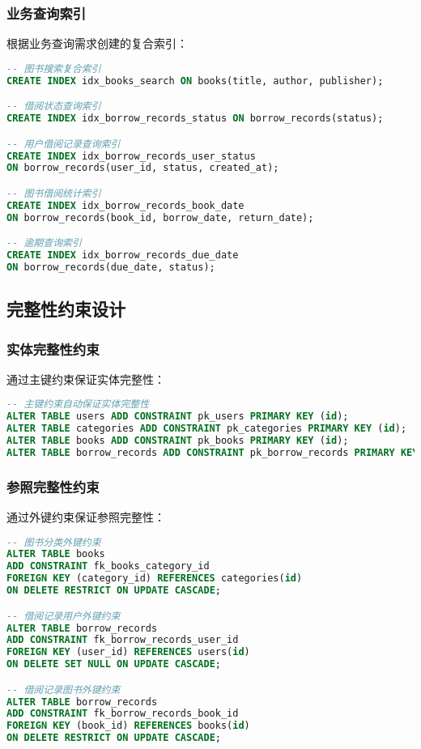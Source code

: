 \documentclass[12pt,a4paper]{article}
\begin{document}
\subsubsection{业务查询索引}
根据业务查询需求创建的复合索引：
\begin{lstlisting}[language=sql]
-- 图书搜索复合索引
CREATE INDEX idx_books_search ON books(title, author, publisher);

-- 借阅状态查询索引
CREATE INDEX idx_borrow_records_status ON borrow_records(status);

-- 用户借阅记录查询索引
CREATE INDEX idx_borrow_records_user_status 
ON borrow_records(user_id, status, created_at);

-- 图书借阅统计索引
CREATE INDEX idx_borrow_records_book_date 
ON borrow_records(book_id, borrow_date, return_date);

-- 逾期查询索引
CREATE INDEX idx_borrow_records_due_date 
ON borrow_records(due_date, status);
\end{lstlisting}

\subsection{完整性约束设计}

\subsubsection{实体完整性约束}
通过主键约束保证实体完整性：
\begin{lstlisting}[language=sql]
-- 主键约束自动保证实体完整性
ALTER TABLE users ADD CONSTRAINT pk_users PRIMARY KEY (id);
ALTER TABLE categories ADD CONSTRAINT pk_categories PRIMARY KEY (id);
ALTER TABLE books ADD CONSTRAINT pk_books PRIMARY KEY (id);
ALTER TABLE borrow_records ADD CONSTRAINT pk_borrow_records PRIMARY KEY (id);
\end{lstlisting}

\subsubsection{参照完整性约束}
通过外键约束保证参照完整性：
\begin{lstlisting}[language=sql]
-- 图书分类外键约束
ALTER TABLE books 
ADD CONSTRAINT fk_books_category_id 
FOREIGN KEY (category_id) REFERENCES categories(id) 
ON DELETE RESTRICT ON UPDATE CASCADE;

-- 借阅记录用户外键约束
ALTER TABLE borrow_records 
ADD CONSTRAINT fk_borrow_records_user_id 
FOREIGN KEY (user_id) REFERENCES users(id) 
ON DELETE SET NULL ON UPDATE CASCADE;

-- 借阅记录图书外键约束
ALTER TABLE borrow_records 
ADD CONSTRAINT fk_borrow_records_book_id 
FOREIGN KEY (book_id) REFERENCES books(id) 
ON DELETE RESTRICT ON UPDATE CASCADE;
\end{lstlisting}
\end{document}
